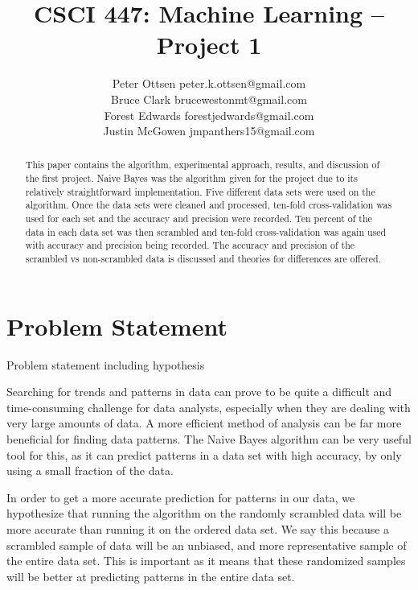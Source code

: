 \documentclass[twoside,11pt]{article}
\begin{document}
\title{CSCI 447: Machine Learning -- Project 1}

\author{\name Peter Ottsen \email peter.k.ottsen@gmail.com\\
\name Bruce Clark \email brucewestonmt@gmail.com\\
\name Forest Edwards \email forestjedwards@gmail.com\\
\name Justin McGowen \email jmpanthers15@gmail.com}


\maketitle

\begin{abstract}%

This paper contains the algorithm, experimental approach, results, and discussion of the first project.  Naive Bayes was the algorithm given for the project due to its relatively straightforward implementation. Five different data sets were used on the algorithm. Once the data sets were cleaned and processed, ten-fold cross-validation was used for each set and the accuracy and precision were recorded. Ten percent of the data in each data set was then scrambled and ten-fold cross-validation was again used with accuracy and precision being recorded.  The accuracy and precision of the scrambled vs non-scrambled data is discussed and theories for differences are offered.

\end{abstract}

\section{Problem Statement}

Problem statement including hypothesis

Searching for trends and patterns in data can prove to be quite a difficult and time-consuming challenge for data analysts, especially when they are dealing with very large amounts of data.  A more efficient method of analysis can be far more beneficial for finding data patterns.  The Naive Bayes algorithm can be very useful tool for this, as it can predict patterns in a data set with high accuracy, by only using a small fraction of the data.  

In order to get a more accurate prediction for patterns in our data, we hypothesize that running the algorithm on the randomly scrambled data will be more accurate than running it on the ordered data set.  We say this because a scrambled sample of data will be an unbiased, and more representative sample of the entire data set.  This is important as it means that these randomized samples will be better at predicting patterns in the entire data set.
\end{document}
